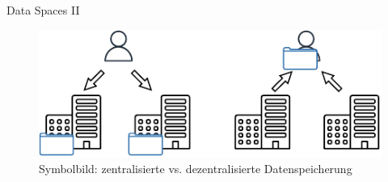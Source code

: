 \begin{frame}[c]{Data Spaces II \footnotesize\cite{mollerIndustrialDataEcosystems2024}}

    \vspace{1.5em}
    \begin{figure}
        \includegraphics[height=0.6\textheight]{./assets/central_vs_decentral.drawio.pdf}
        \caption{Symbolbild: zentralisierte vs. dezentralisierte Datenspeicherung}
    \end{figure}
\end{frame}


